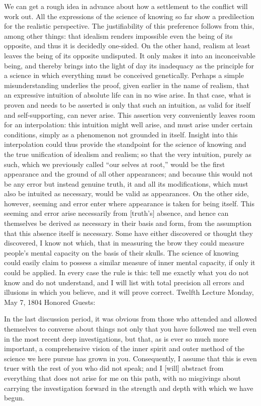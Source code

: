 We can get a rough idea in advance about
how a settlement to the conflict will work out.
All the expressions of the science of knowing so far
show a predilection for the realistic perspective.
The justifiability of this preference follows
from this, among other things:
that idealism renders impossible
even the being of its opposite,
and thus it is decidedly one-sided.
On the other hand, realism at least leaves
the being of its opposite undisputed.
It only makes it into an inconceivable being,
and thereby brings into the light of day
its inadequacy as the principle for a science
in which everything must be conceived genetically.
Perhaps a simple misunderstanding underlies the proof,
given earlier in the name of realism,
that an expressive intuition of
absolute life can in no wise arise.
In that case, what is proven
and needs to be asserted is only that
such an intuition,
as valid for itself and self-supporting,
can never arise.
This assertion very conveniently
leaves room for an interpolation:
this intuition might well arise,
and must arise under certain conditions,
simply as a phenomenon not grounded in itself.
Insight into this interpolation could thus provide
the standpoint for the science of knowing
and the true unification of idealism and realism;
so that the very intuition, purely as such,
which we previously called “our selves at root,”
would be the first appearance
and the ground of all other appearances;
and because this would not be any error
but instead genuine truth,
it and all its modifications,
which must also be intuited as necessary,
would be valid as appearances.
On the other side, however, seeming and error
enter where appearance is taken for being itself.
This seeming and error arise necessarily from [truth’s] absence,
and hence can themselves be derived
as necessary in their basis and form,
from the assumption that this absence itself is necessary.
Some have either discovered or thought they discovered,
I know not which, that in measuring the brow
they could measure people’s mental capacity
on the basis of their skulls.
The science of knowing could easily claim
to possess a similar measure of inner mental capacity,
if only it could be applied.
In every case the rule is this:
tell me exactly what you do not know
and do not understand,
and I will list with total precision
all errors and illusions in which you believe,
and it will prove correct.
Twelfth Lecture
Monday, May 7, 1804
Honored Guests:

In the last discussion period,
it was obvious from those who attended
and allowed themselves to converse about things
not only that you have followed me well
even in the most recent deep investigations,
but that, as is ever so much more important,
a comprehensive vision of the inner spirit
and outer method of the science
we here pursue has grown in you.
Consequently, I assume that this is
even truer with the rest of you who did not speak;
and I [will] abstract from everything
that does not arise for me on this path,
with no misgivings about carrying the investigation
forward in the strength and depth with which we have begun.

